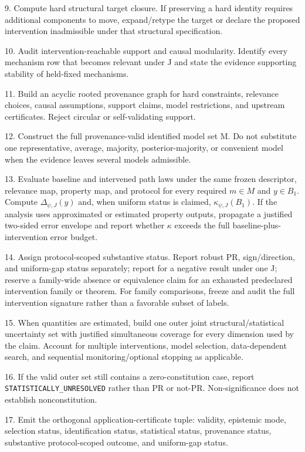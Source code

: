 \documentclass[10pt]{article}
\newcommand{\status}[1]{\mbox{\texttt{\scriptsize\detokenize{#1}}}}
\begin{document}
9. Compute hard structural target closure. If preserving a hard identity
requires additional components to move, expand/retype the target or
declare the proposed intervention inadmissible under that structural
specification.

10. Audit intervention-reachable support and causal modularity. Identify
every mechanism row that becomes relevant under J and state the evidence
supporting stability of held-fixed mechanisms.

11. Build an acyclic rooted provenance graph for hard constraints,
relevance choices, causal assumptions, support claims, model
restrictions, and upstream certificates. Reject circular or
self-validating support.

12. Construct the full provenance-valid identified model set M. Do not
substitute one representative, average, majority, posterior-majority, or
convenient model when the evidence leaves several models admissible.

13. Evaluate baseline and intervened path laws under the same frozen descriptor, relevance map, property map, and protocol for every required $m\in M$ and $y\in B_1$. Compute $\Delta_{\psi,J}(y)$ and, when uniform status is claimed, $\kappa_{\psi,J}(B_1)$. If the analysis uses approximated or estimated property outputs, propagate a justified two-sided error envelope and report whether $\kappa$ exceeds the full baseline-plus-intervention error budget.

14. Assign protocol-scoped substantive status. Report robust PR, sign/direction, and uniform-gap status separately; report \status{ROBUST_NONCONSTITUTIVE_UNDER_FROZEN_PROTOCOL} for a negative result under one J; reserve a family-wide absence or equivalence claim for an exhausted predeclared intervention family or theorem. For family comparisons, freeze and audit the full intervention signature rather than a favorable subset of labels.

15. When quantities are estimated, build one outer joint
structural/statistical uncertainty set with justified simultaneous
coverage for every dimension used by the claim. Account for multiple
interventions, model selection, data-dependent search, and sequential
monitoring/optional stopping as applicable.

16. If the valid outer set still contains a zero-constitution case,
report \texttt{STATISTICALLY\_UNRESOLVED} rather than PR or not-PR.
Non-significance does not establish nonconstitution.

17. Emit the orthogonal application-certificate tuple: validity,
epistemic mode, selection status, identification status, statistical
status, provenance status, substantive protocol-scoped outcome, and
uniform-gap status.
\end{document}
